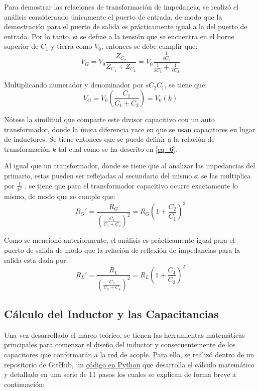 \documentclass[conference]{IEEEtran}
\begin{document}
Para demostrar las relaciones de transformación de impedancia, se realizó el análisis considerando únicamente el puerto de entrada, de modo que la demostración para el puerto de salida es prácticamente igual a la del puerto de entrada. Por lo tanto, si se define a la tensión que se encuentra en el borne superior de $C_{1}$ y tierra como $V_0$, entonces se debe cumplir que:
\begin{equation}
    V_{G} = V_{0} \frac{Z_{C_{2}}}{Z_{C_{1}} + Z_{C_{2}}} = V_{0} \frac{\frac{1}{sC_{2}}}{\frac{1}{sC_{1}} + \frac{1}{sC_{2}}}
    \label{eq_5}
\end{equation}

Multiplicando numerador y denominador por $sC_{2}C_{1}$, se tiene que:
\begin{equation}
    V_{G} = V_{0} \left(\frac{C_{1}}{C_{1} + C_{2}}\right) = V_{0}(k)
    \label{eq_6}
\end{equation}

Nótese la similitud que comparte este divisor capacitivo con un auto transformador, donde la única diferencia yace en que se usan capacitores en lugar de inductores. Se tiene entonces que se puede definir a la relación de transformación $k$ tal cual como se ha descrito en \eqref{eq_6}.

Al igual que un transformador, donde se tiene que al analizar las impedancias del primario, estas pueden ser reflejadas al secundario del mismo si se las multiplica por $\frac{1}{k^{2}}$ \cite{B1}, se tiene que para el transformador capacitivo ocurre exactamente lo mismo, de modo que se cumple que:
\begin{equation}
    R_{G}' = \frac{R_{G}}{\left(\frac{C_{1}}{C_{1} + C_{2}}\right)^{2}} = R_{G} \left(1 + \frac{C_{2}}{C_{1}}\right)^{2}
    \label{eq_7}
\end{equation}

Como se mencionó anteriormente, el análisis es prácticamente igual para el puerto de salida de modo que la relación de reflexión de impedancias para la salida esta dada por:
\begin{equation}
    R_{L}' = \frac{R_{L}}{\left(\frac{C_{3}}{C_{3} + C_{4}}\right)^{2}} = R_{L} \left(1 + \frac{C_{4}}{C_{3}}\right)^{2}
    \label{eq_8}
\end{equation}



\subsection{Cálculo del Inductor y las Capacitancias}                       
Una vez desarrollado el marco teórico, se tienen las herramientas matemáticas principales para comenzar el diseño del inductor y consecuentemente de los capacitores que conformarán a la red de acople. Para ello, se realizó dentro de un repositorio de GitHub, un \href{https://github.com/ErnestMonja/Electronica_Analogica_III/blob/main/Trabajo%20Pr%C3%A1ctico%20N%C2%B01%20-%20Circuitos%20Sintonizados/TP1%20-%20Script%20de%20Inductor-Capacitores%20(Final).ipynb}{código en Python} \cite{B2} que desarrolla el cálculo matemático y detallado en una serie de 11 pasos los cuales se explican de forma breve a continuación:
\end{document}
